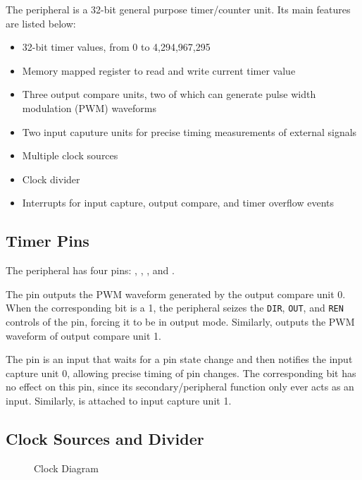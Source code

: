 The  peripheral is a 32-bit general purpose timer/counter unit. Its main features are listed below:

\begin{itemize}
	\item 32-bit timer values, from 0 to 4,294,967,295
	\item Memory mapped register to read and write current timer value
	\item Three output compare units, two of which can generate pulse width modulation (PWM) waveforms
	\item Two input caputure units for precise timing measurements of external signals
	\item Multiple clock sources
	\item Clock divider
	\item Interrupts for input capture, output compare, and timer overflow events
\end{itemize}



\subsection{Timer Pins}

The  peripheral has four pins: , , , and .

The  pin outputs the PWM waveform generated by the output compare unit 0. When the corresponding  bit is a 1, the  peripheral seizes the \texttt{DIR}, \texttt{OUT}, and \texttt{REN} controls of the pin, forcing it to be in output mode. Similarly,  outputs the PWM waveform of output compare unit 1.

The  pin is an input that waits for a pin state change and then notifies the input capture unit 0, allowing precise timing of pin changes. The corresponding  bit has no effect on this pin, since its secondary/peripheral function only ever acts as an input. Similarly,  is attached to input capture unit 1.



\subsection{Clock Sources and Divider}

\begin{figure}[htpb]
	
	\caption{ Clock Diagram}
	\label{fig:timer-clock-diagram}
\end{figure}

